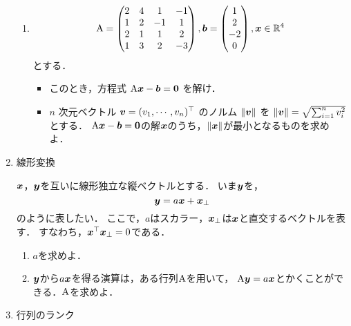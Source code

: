 \begin{enumerate}[label=問\arabic*.]
\begin{enumerate}[label=(\roman*)]
    \item
    \begin{equation}
      \mathrm{A} =
        \begin{pmatrix}
          2 & 4 & 1 & -1 \\
          1 & 2 & -1 & 1 \\
          2 & 1 & 1 & 2 \\
          1 & 3 & 2 & -3
        \end{pmatrix},
      \boldsymbol{b} =
        \begin{pmatrix}
          1 \\ 2 \\ -2 \\ 0
        \end{pmatrix},
      \boldsymbol{x} \in \mathbb{R}^4
    \end{equation}
    とする．
    \begin{itemize}
      \item このとき，方程式 $\mathrm{A} \boldsymbol{x} - \boldsymbol{b} = \boldsymbol{0}$ を解け．
      \item $n$ 次元ベクトル $\boldsymbol{v} = (v_1, \cdots, v_n)^\top$ のノルム $\|\boldsymbol{v}\|$ を
        $\|\boldsymbol{v}\| = \sqrt{\sum_{i=1}^n v_i^2}$ とする．
        $\mathrm{A} \boldsymbol{x} - \boldsymbol{b} = \boldsymbol{0}$の解$\boldsymbol{x}$のうち，$\|\boldsymbol{x}\|$が最小となるものを求めよ．
    \end{itemize}
  \end{enumerate}
  \item 線形変換

  \vspace{1mm}
  $\boldsymbol{x}$，$\boldsymbol{y}$を互いに線形独立な縦ベクトルとする．
  いま$\boldsymbol{y}$を，
  \begin{equation}
    \boldsymbol{y} = a \boldsymbol{x} + \boldsymbol{x}_\perp
  \end{equation}
  のように表したい．
  ここで，$a$はスカラー，$\boldsymbol{x}_{\perp}$は$\boldsymbol{x}$と直交するベクトルを表す．
  すなわち，$\boldsymbol{x}^\top \boldsymbol{x}_{\perp} = 0$である．
  \begin{enumerate}[label=(\roman*)]
    \item $a$を求めよ．
    \item $\boldsymbol{y}$から$a \boldsymbol{x}$を得る演算は，ある行列$\mathrm{A}$を用いて，
      $\mathrm{A}\boldsymbol{y} = a \boldsymbol{x}$とかくことができる．$\mathrm{A}$を求めよ．
  \end{enumerate}
  \item 行列のランク


\end{enumerate}
